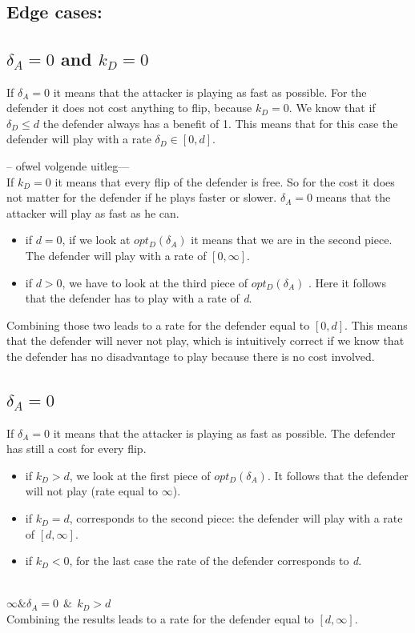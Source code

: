 ~~\\


\subsection*{Edge cases:}

\subsection*{$\delta_{A}=0$ and $k_{D}=0$}
If $\delta_{A}=0$ it means that the attacker is playing as fast as possible. For the defender it does not cost anything to flip, because $k_{D}=0$. We know that if $\delta_{D} \leq d$ the defender always has a benefit of 1. This means that for this case the defender will play with a rate $\delta_{D} \in [0,d]$.

-- ofwel volgende uitleg--- \\
If $k_{D}=0$ it means that every flip of the defender is free. So for the cost it does not matter for the defender if he plays faster or slower. $\delta_{A}=0$ means that the attacker will play as fast as he can.  
\begin{itemize}
\item if $d=0$, if we look at $opt_{D}(\delta_{A})$ it means that we are in the second piece. The defender will play with a rate of $[0,\infty]$. 
\item if $d >0$, we have to look at the third piece of  $opt_{D}(\delta_{A})$ . Here it follows that the defender has to play with a rate of \textit{d}.
\end{itemize}

Combining those two leads to a rate for the defender equal to $[0,d]$. This means that the defender will never not play, which is intuitively correct if we know that the defender has no disadvantage to play because there is no cost involved.
\subsection*{$\delta_{A}=0$}
If $\delta_{A}=0$ it means that the attacker is playing as fast as possible. The defender has still a cost for every flip.
\begin{itemize}
\item if $k_{D} > d$, we look at the first piece of $opt_{D}(\delta_{A})$. It follows that the defender will not play (rate equal to $\infty$).
\item if $k_{D}=d$, corresponds to the second piece: the defender will play with a rate of $[d,\infty]$.
\item if $k_{D} < 0$, for the last case the rate of the defender corresponds to \textit{d}.
\end{itemize}
~~\\
   $  \infty \& \delta_{A}=0 ~~ \& ~~ k_{D} > d$ \\
Combining the results leads to a rate for the defender equal to $[d,\infty]$. 
